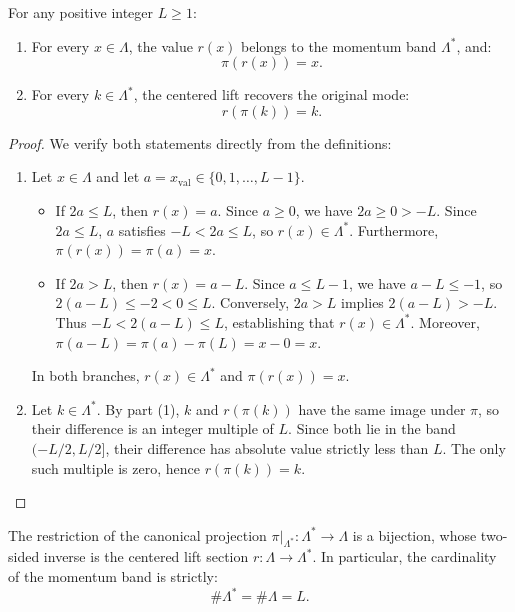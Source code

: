 \begin{lemma}
\label{lem:section_identities}
For any positive integer $L \ge 1$:
\begin{enumerate}
    \item For every $x \in \Lambda$, the value $r(x)$ belongs to the momentum band $\Lambda^*$, and:
    \begin{equation}
    \pi(r(x)) = x.
    \end{equation}
    \item For every $k \in \Lambda^*$, the centered lift recovers the original mode:
    \begin{equation}
    r(\pi(k)) = k.
    \end{equation}
\end{enumerate}
\end{lemma}

\begin{proof}
We verify both statements directly from the definitions:
\begin{enumerate}
    \item Let $x \in \Lambda$ and let $a = x_{\mathrm{val}} \in \{0, 1, \dots, L-1\}$.
    \begin{itemize}
        \item If $2a \le L$, then $r(x) = a$. Since $a \ge 0$, we have $2a \ge 0 > -L$. Since $2a \le L$, $a$ satisfies $-L < 2a \le L$, so $r(x) \in \Lambda^*$. Furthermore, $\pi(r(x)) = \pi(a) = x$.
        \item If $2a > L$, then $r(x) = a - L$. Since $a \le L - 1$, we have $a - L \le -1$, so $2(a - L) \le -2 < 0 \le L$. Conversely, $2a > L$ implies $2(a - L) > -L$. Thus $-L < 2(a - L) \le L$, establishing that $r(x) \in \Lambda^*$. Moreover, $\pi(a - L) = \pi(a) - \pi(L) = x - 0 = x$.
    \end{itemize}
    In both branches, $r(x) \in \Lambda^*$ and $\pi(r(x)) = x$.
    
    \item Let $k\in\Lambda^*$. By part (1), $k$ and $r(\pi(k))$ have the same image under $\pi$, so their difference is an integer multiple of $L$. Since both lie in the band $(-L/2,L/2]$, their difference has absolute value strictly less than $L$. The only such multiple is zero, hence $r(\pi(k))=k$.
\end{enumerate}
\end{proof}

\begin{corollary}
The restriction of the canonical projection $\pi|_{\Lambda^*} : \Lambda^* \to \Lambda$ is a bijection, whose two-sided inverse is the centered lift section $r : \Lambda \to \Lambda^*$. In particular, the cardinality of the momentum band is strictly:
\begin{equation}
\#\Lambda^* = \#\Lambda = L.
\end{equation}
\end{corollary}

